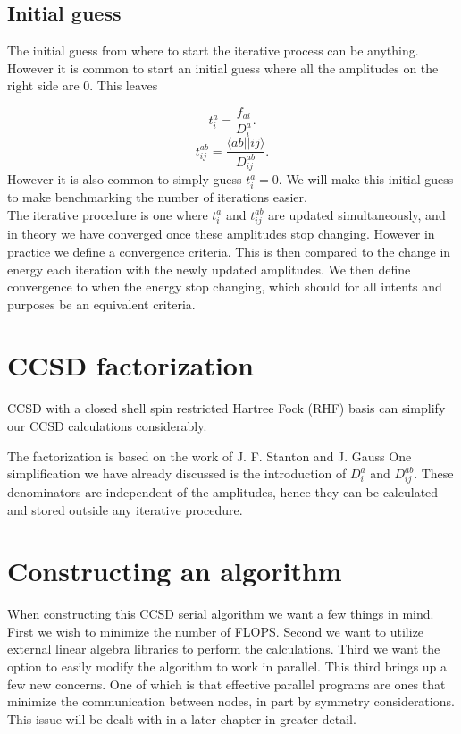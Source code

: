 \documentclass[graybox,sectrefs,envcountresetchap,open=right]{svmonodo}
\begin{document}
\subsection{Initial guess}
The initial guess from where to start the iterative process can be anything. However it is common to start an initial guess where all the amplitudes on the right side are 0. This leaves

\begin{equation}
t_i^a = \frac{f_{ai}}{D_i^a} .
\end{equation}
\begin{equation}
t_{ij}^{ab} = \frac{\langle ab || ij \rangle}{D_{ij}^{ab}} .
\end{equation}
However it is also common to simply guess $t_i^a = 0$. We will make this initial guess to make benchmarking the number of iterations easier. \\

The iterative procedure is one where $t_i^a$ and $t_{ij}^{ab}$ are updated simultaneously, and in theory we have converged once these amplitudes stop changing. However in practice we define a convergence criteria. This is then compared to the change in energy each iteration with the newly updated amplitudes. We then define convergence to when the energy stop changing, which should for all intents and purposes be an equivalent criteria. 


\section{CCSD factorization}
CCSD with a closed shell spin
restricted Hartree Fock (RHF) basis can simplify our CCSD calculations
considerably.


The factorization is based on the work of J. F. Stanton and J. Gauss
One simplification we have already discussed is the introduction of
$D_i^a$ and $D_{ij}^{ab}$. These denominators are independent of the
amplitudes, hence they can be calculated and stored outside any
iterative procedure.


\section{Constructing an algorithm}
When constructing this CCSD serial algorithm we want a few things in mind. First we wish to minimize the number of FLOPS. Second we want to utilize external linear algebra libraries to perform the calculations. Third we want the option to easily modify the algorithm to work in parallel. This third brings up a few new concerns. One of which is that effective parallel programs are ones that minimize the communication between nodes, in part by  symmetry considerations. This issue will be dealt with in a later chapter in greater detail.
\end{document}
